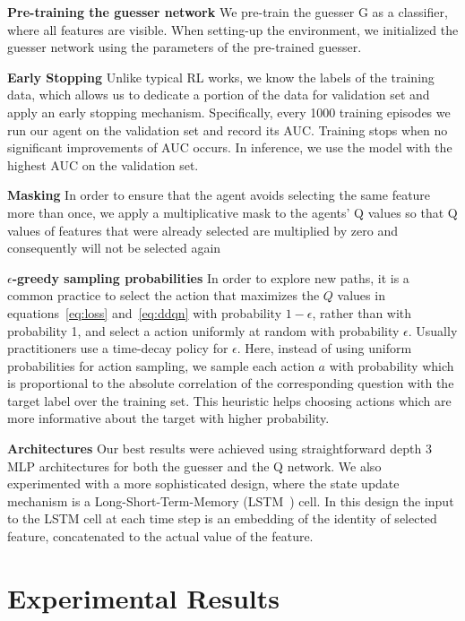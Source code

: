 \documentclass[reqno,11pt]{article}
\begin{document}
\noindent \textbf{Pre-training the guesser network}
We pre-train the guesser G as a classifier, where all features are visible. 
When setting-up the environment, we initialized the guesser network using the parameters of the pre-trained guesser.

\noindent \textbf{Early Stopping}
Unlike typical RL works, we know the labels of the training data, which allows us to dedicate a portion of the data for validation set and apply an early stopping mechanism.
Specifically, every 1000 training episodes we run our agent on the validation set and record its AUC. Training stops when no significant improvements of AUC occurs. 
In inference, we use the model with the highest AUC on the validation set.

\noindent \textbf{Masking}
In order to ensure that the agent avoids selecting the same feature more than once, we apply a multiplicative mask to the agents' Q values so that Q values of features that were already selected are multiplied by zero and consequently will not be selected again 

\noindent \textbf{$\epsilon$-greedy sampling probabilities}
In order to explore new paths, it is a common practice to select the action that maximizes the $Q$ values in equations~\eqref{eq:loss} and~\eqref{eq:ddqn} with probability $1-\epsilon$, rather than with probability 1, and select a action uniformly at random with probability $\epsilon$. Usually practitioners use a time-decay policy for $\epsilon$.
Here, instead of using uniform probabilities for action sampling, we sample each action $a$ with probability which is proportional to the absolute correlation of the corresponding question with the target label over the training set.
This heuristic helps choosing actions which are more informative about the target with higher probability.

\noindent \textbf{Architectures}
Our best results were achieved using straightforward depth 3 MLP architectures for both the guesser and the Q network.
We also experimented with a more sophisticated design, where the state update mechanism is a Long-Short-Term-Memory (LSTM~\citep{hochreiter1997long}) cell. 
In this design the input to the LSTM cell at each time step is an embedding of the identity of selected feature, concatenated to the actual value of the feature.


\section {Experimental Results}\label{sec:experimental}
\end{document}
